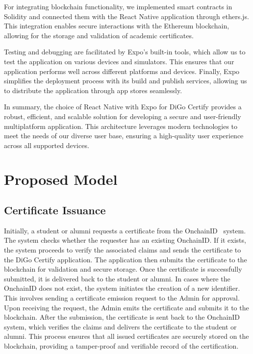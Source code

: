 For integrating blockchain functionality, we implemented smart contracts in Solidity and connected them with the React Native application through ethers.js. This integration enables secure interactions with the Ethereum blockchain, allowing for the storage and validation of academic certificates.

Testing and debugging are facilitated by Expo’s built-in tools, which allow us to test the application on various devices and simulators. This ensures that our application performs well across different platforms and devices. Finally, Expo simplifies the deployment process with its build and publish services, allowing us to distribute the application through app stores seamlessly.

In summary, the choice of React Native with Expo for DiGo Certify provides a robust, efficient, and scalable solution for developing a secure and user-friendly multiplatform application. This architecture leverages modern technologies to meet the needs of our diverse user base, ensuring a high-quality user experience across all supported devices.

\section{Proposed Model}

\subsection{Certificate Issuance}

Initially, a student or alumni requests a certificate from the OnchainID~\cite{ONCHAINID} system. The system checks whether the requester has an existing OnchainID. If it exists, the system proceeds to verify the associated claims and sends the certificate to the DiGo Certify application. The application then submits the certificate to the blockchain for validation and secure storage. Once the certificate is successfully submitted, it is delivered back to the student or alumni. In cases where the OnchainID does not exist, the system initiates the creation of a new identifier. This involves sending a certificate emission request to the Admin for approval. Upon receiving the request, the Admin emits the certificate and submits it to the blockchain. After the submission, the certificate is sent back to the OnchainID system, which verifies the claims and delivers the certificate to the student or alumni. This process ensures that all issued certificates are securely stored on the blockchain, providing a tamper-proof and verifiable record of the certification.

